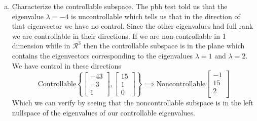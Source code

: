 \documentclass{article}
\begin{document}
\begin{enumerate}[(a)]
\item Characterize the controllable subspace.
\newline
\newline
The pbh test told us that the eigenvalue $\lambda = -4$ is uncontrollable which tells us that in the direction of that eigenvector we have no control.
Since the other eigenvalues had full rank we are controllable in their directions.
If we are non-controllable in 1 dimension while in $\mathcal{R}^3$ then the controllable subspace is in the plane which contains the eigenvectors corresponding to the eigenvalues $\lambda = 1$ and $\lambda = 2$.
We have control in these directions
$$
\text{Controllable}
\left\{
\begin{bmatrix}
-43 \\
-3 \\
1
\end{bmatrix}
,
\begin{bmatrix}
15 \\
1 \\
0
\end{bmatrix}
\right\}
\implies
\text{Noncontrollable}
\begin{bmatrix}
-1 \\
15 \\
2 \\
\end{bmatrix}
$$
Which we can verify by seeing that the noncontrollable subspace is in the left nullspace of the eigenvalues of our controllable eigenvalues.


\end{enumerate}
\end{document}
